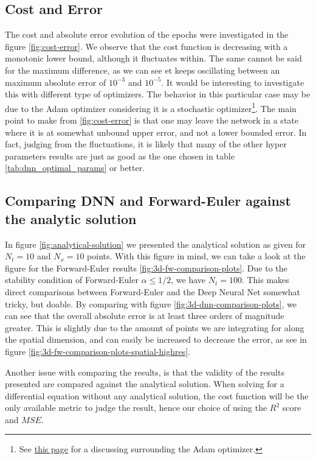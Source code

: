 \subsection{Cost and Error}
The cost and absolute error evolution of the epochs were investigated in the figure \ref{fig:cost-error}. We observe that the cost function is decreasing with a monotonic lower bound, although it fluctuates within. The same cannot be said for the maximum difference, as we can see et keeps oscillating between an maximum absolute error of $10^{-3}$ and $10^{-5}$. It would be interesting to investigate this with different type of optimizers. The behavior in this particular case may be due to the Adam optimizer considering it is a stochastic optimizer\footnote{See \href{https://machinelearningmastery.com/adam-optimization-algorithm-for-deep-learning/}{this page} for a discussing surrounding the Adam optimizer.}. The main point to make from \ref{fig:cost-error} is that one may leave the network in a state where it is at somewhat unbound upper error, and not a lower bounded error. In fact, judging from the fluctuations, it is likely that many of the other hyper parameters results are just as good as the one chosen in table \ref{tab:dnn_optimal_params} or better.

\subsection{Comparing DNN and Forward-Euler against the analytic solution}
In figure \ref{fig:analytical-solution} we presented the analytical solution as given for $N_t=10$ and $N_x=10$ points. With this figure in mind, we can take a look at the figure for the Forward-Euler results \ref{fig:3d-fw-comparison-plots}. Due to the stability condition of Forward-Euler $\alpha \leq 1/2$, we have $N_t=100$. This makes direct comparisons between Forward-Euler and the Deep Neural Net somewhat tricky, but doable. By comparing with figure \ref{fig:3d-dnn-comparison-plots}, we can see that the overall absolute error is at least three orders of magnitude greater. This is slightly due to the amount of points we are integrating for along the spatial dimension, and can easily be increased to decrease the error, as see in figure \ref{fig:3d-fw-comparison-plots-spatial-highres}.

Another issue with comparing the results, is that the validity of the results presented are compared against the analytical solution. When solving for a differential equation without any analytical solution, the cost function will be the only available metric to judge the result, hence our choice of using the $R^2$ score and $MSE$.

